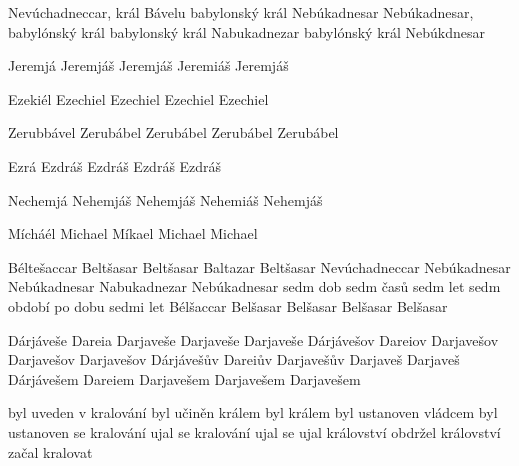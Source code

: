        {Nevúchadneccar, král Bávelu}
       {babylonský král Nebúkadnesar}
       {Nebúkadnesar, babylónský král}
       {babylonský král Nabukadnezar}                  
       {babylónský král Nebúkdnesar}                        

        {Jeremjá} %
        {Jeremjáš} %
        {Jeremjáš} %
        {Jeremiáš} %
        {Jeremjáš} %

       {Ezekiél} %
       {Ezechiel} %
       {Ezechiel} %
       {Ezechiel} %
       {Ezechiel} %




       {Zerubbável} %
       {Zerubábel} %
       {Zerubábel} %
       {Zerubábel} %
       {Zerubábel} %

       {Ezrá} %
       {Ezdráš} %
       {Ezdráš} %
       {Ezdráš} %
       {Ezdráš} %

       {Nechemjá} %
       {Nehemjáš} %
       {Nehemjáš} %
       {Nehemiáš} %
       {Nehemjáš} %

       {Mícháél} %
       {Michael} %
       {Míkael} %
       {Michael} %
       {Michael} %





       {Béltešaccar}  {Beltšasar}    {Beltšasar}    {Baltazar} {Beltšasar}
 {Nevúchadneccar}  {Nebúkadnesar} {Nebúkadnesar} {Nabukadnezar} {Nebúkadnesar}
 {sedm dob} {sedm časů} {sedm let} {sedm období} {po dobu sedmi let}
  {Bélšaccar} {Belšasar}   {Belšasar}  {Belšasar}  {Belšasar}

   {Dárjáveše}  {Dareia}  {Darjaveše}  {Darjaveše}  {Darjaveše}
  {Dárjávešov} {Dareiov} {Darjavešov} {Darjavešov} {Darjavešov}
 {Dárjávešův} {Dareiův} {Darjavešův} {Darjaveš} {Darjaveš}
 {Dárjávešem} {Dareiem} {Darjavešem} {Darjavešem} {Darjavešem}

        {byl uveden v kralování} 
        {byl učiněn králem} 
        {byl králem} 
        {byl ustanoven vládcem} 
        {byl ustanoven}
      {se kralování ujal}
      {se kralování ujal}
      {se ujal království}
      {obdržel království}
      {začal kralovat}
    




